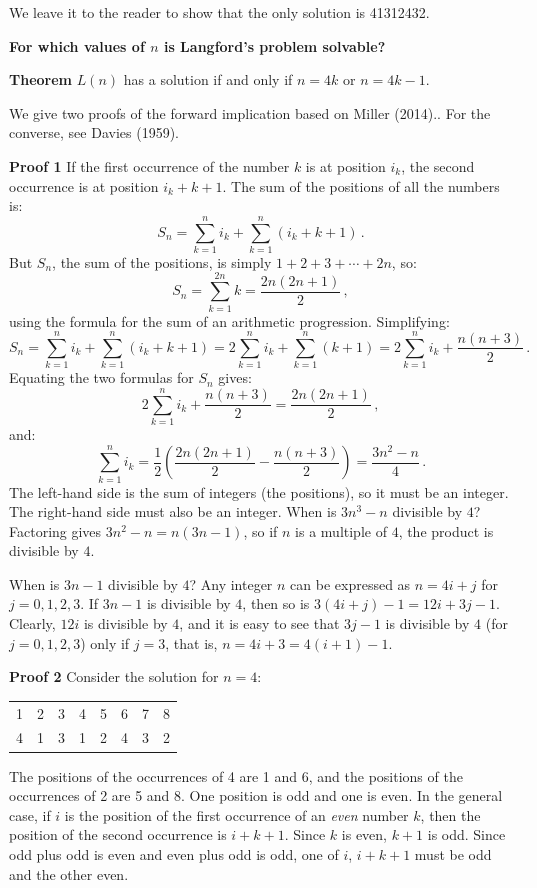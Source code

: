 \documentclass[11pt,a4paper]{report}
\begin{document}
We leave it to the reader to show that the only solution is 41312432.

\newpage

\begin{center}
\textbf{\Large For which values of $n$ is Langford's problem solvable?}
\end{center}

\textbf{Theorem} $L(n)$ has a solution if and only if $n=4k$ or $n=4k-1$.

We give two proofs of the forward implication based on Miller (2014).. For the converse, see Davies (1959).

\bigskip

\textbf{Proof 1} If the first occurrence of the number $k$ is at position $i_k$, the second occurrence is at position $i_k+k+1$. The sum of the positions of all the numbers is:
\[
S_n=\sum_{k=1}^{n}i_k+\sum_{k=1}^{n}(i_k+k+1)\,.
\]
But $S_n$, the sum of the positions, is simply $1+2+3+\cdots+2n$, so:
\[
S_n=\sum_{k=1}^{2n}k = \frac{2n(2n+1)}{2}\,,
\]
using the formula for the sum of an arithmetic progression. Simplifying:
\[
S_n=\sum_{k=1}^{n}i_k+\sum_{k=1}^{n}(i_k+k+1) = 2\sum_{k=1}^{n}i_k+\sum_{k=1}^{n}(k+1) = 2\sum_{k=1}^{n}i_k+\frac{n(n+3)}{2}\,.
\]
Equating the two formulas for $S_n$ gives:
\[
2\sum_{k=1}^{n}i_k+\frac{n(n+3)}{2} = \frac{2n(2n+1)}{2}\,,
\]
and:
\[
\sum_{k=1}^{n}i_k = \frac{1}{2}\left(\frac{2n(2n+1)}{2} - \frac{n(n+3)}{2}\right) = \frac{3n^2-n}{4}\,.
\]
The left-hand side is the sum of integers (the positions), so it must be an integer. The right-hand side must also be an integer. When is $3n^3-n$ divisible by $4$? Factoring gives $3n^2-n=n(3n-1)$, so if $n$ is a multiple of $4$, the product is divisible by $4$.

When is $3n-1$ divisible by $4$? Any integer $n$ can be expressed as $n=4i+j$ for $j=0,1,2,3$. If $3n-1$ is divisible by $4$, then so is $3(4i+j)-1 = 12i+3j-1$. Clearly, $12i$ is divisible by $4$, and it is easy to see that $3j-1$ is divisible by $4$ (for $j=0,1,2,3$) only if $j=3$, that is, $n=4i+3=4(i+1)-1$.

\newpage

\textbf{Proof 2} Consider the solution for $n=4$:
\begin{center}
\begin{tabular}{cccccccc}
1&2&3&4&5&6&7&8\\
4&1&3&1&2&4&3&2
\end{tabular}
\end{center}

The positions of the occurrences of 4 are 1 and 6, and the positions of the occurrences of 2 are 5 and 8. One position is odd and one is even. In the general case, if $i$ is the position of the first occurrence of an \emph{even} number $k$, then the position of the second occurrence is $i+k+1$. Since $k$ is even, $k+1$ is odd. Since odd plus odd is even and even plus odd is odd, one of $i$, $i+k+1$ must be odd and the other even.
\end{document}
